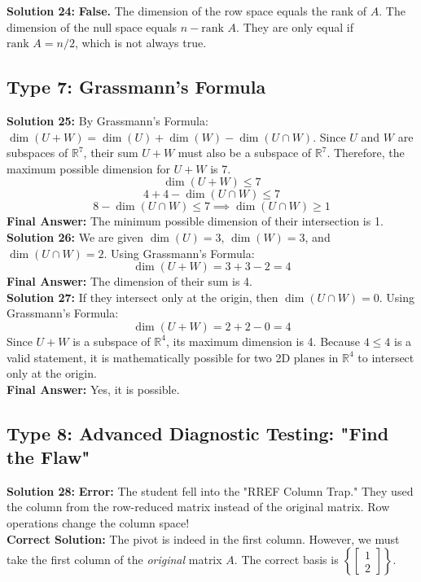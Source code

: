 \documentclass{article}
\begin{document}
\textbf{Solution 24:} \textbf{False.} The dimension of the row space equals the rank of $A$. The dimension of the null space equals $n - \text{rank } A$. They are only equal if $\text{rank } A = n/2$, which is not always true. \\

\subsection*{Type 7: Grassmann's Formula}
\textbf{Solution 25:}
By Grassmann's Formula: $\dim(U + W) = \dim(U) + \dim(W) - \dim(U \cap W)$.
Since $U$ and $W$ are subspaces of $\mathbb{R}^7$, their sum $U + W$ must also be a subspace of $\mathbb{R}^7$. Therefore, the maximum possible dimension for $U + W$ is 7.
$$ \dim(U + W) \le 7 $$
$$ 4 + 4 - \dim(U \cap W) \le 7 $$
$$ 8 - \dim(U \cap W) \le 7 \implies \dim(U \cap W) \ge 1 $$
\textbf{Final Answer:} The minimum possible dimension of their intersection is 1. \\

\textbf{Solution 26:}
We are given $\dim(U) = 3$, $\dim(W) = 3$, and $\dim(U \cap W) = 2$.
Using Grassmann's Formula:
$$ \dim(U + W) = 3 + 3 - 2 = 4 $$
\textbf{Final Answer:} The dimension of their sum is 4. \\

\textbf{Solution 27:}
If they intersect only at the origin, then $\dim(U \cap W) = 0$.
Using Grassmann's Formula:
$$ \dim(U + W) = 2 + 2 - 0 = 4 $$
Since $U + W$ is a subspace of $\mathbb{R}^4$, its maximum dimension is 4. Because $4 \le 4$ is a valid statement, it is mathematically possible for two 2D planes in $\mathbb{R}^4$ to intersect only at the origin. \\
\textbf{Final Answer:} Yes, it is possible. \\

\subsection*{Type 8: Advanced Diagnostic Testing: "Find the Flaw"}
\textbf{Solution 28:}
\textbf{Error:} The student fell into the "RREF Column Trap." They used the column from the row-reduced matrix instead of the original matrix. Row operations change the column space! \\
\textbf{Correct Solution:} The pivot is indeed in the first column. However, we must take the first column of the \textit{original} matrix $A$. The correct basis is $\left\{ \begin{bmatrix} 1 \\ 2 \end{bmatrix} \right\}$. \\
\end{document}
